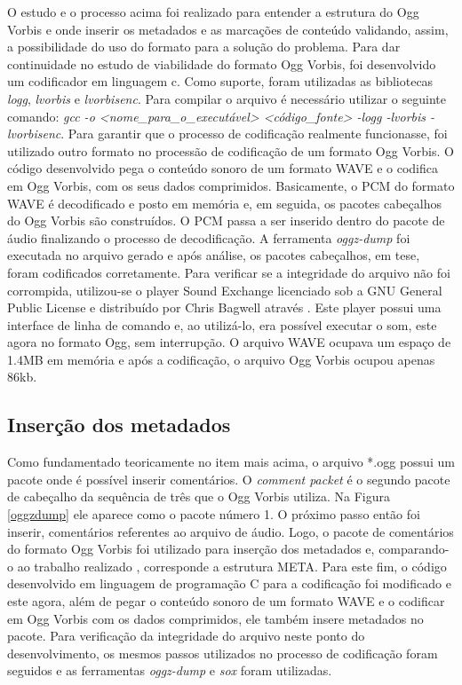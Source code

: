 O estudo e o processo acima foi realizado para entender a estrutura do Ogg Vorbis e onde inserir os metadados e as marcações de conteúdo validando, assim, a possibilidade do uso do formato para a solução do problema. Para dar continuidade no estudo de viabilidade do formato Ogg Vorbis, foi desenvolvido um codificador em linguagem c. Como suporte, foram utilizadas as bibliotecas \textit{logg}, \textit{lvorbis} e \textit{lvorbisenc}. Para compilar o arquivo é necessário utilizar o seguinte comando: \textit{gcc -o <nome\_para\_o\_executável> <código\_fonte> -logg -lvorbis -lvorbisenc}. Para garantir que o processo de codificação realmente funcionasse, foi utilizado outro formato no processão de codificação de um formato Ogg Vorbis. O código desenvolvido pega o conteúdo sonoro de um formato WAVE e o codifica em Ogg Vorbis, com os seus dados comprimidos. Basicamente, o PCM do formato WAVE é decodificado e posto em memória e, em seguida, os pacotes cabeçalhos do Ogg Vorbis são construídos. O PCM passa a ser inserido dentro do pacote de áudio finalizando o processo de decodificação. A ferramenta \textit{oggz-dump} foi executada no arquivo gerado e após análise, os pacotes cabeçalhos, em tese, foram codificados corretamente. Para verificar se a integridade do arquivo não foi corrompida, utilizou-se o player Sound Exchange licenciado sob a GNU General Public License e distribuído por Chris Bagwell através \cite{sox}. Este player possui uma interface de linha de comando e, ao utilizá-lo, era possível executar o som, este agora no formato Ogg, sem interrupção. O arquivo WAVE ocupava um espaço de 1.4MB em memória e após a codificação, o arquivo Ogg Vorbis ocupou apenas 86kb.



\subsection{Inserção dos metadados}

Como fundamentado teoricamente no item mais acima, o arquivo *.ogg possui um pacote onde é possível inserir comentários. O \textit{comment packet} é o segundo pacote de cabeçalho da sequência de três que o Ogg Vorbis utiliza. Na Figura \ref{oggzdump} ele aparece como o pacote número 1. O próximo passo então foi inserir, comentários referentes ao arquivo de áudio. Logo, o pacote de comentários do formato Ogg Vorbis foi utilizado para inserção dos metadados e, comparando-o ao trabalho realizado \cite{herbert}, corresponde a estrutura META. Para este fim, o código desenvolvido em linguagem de programação C para a codificação foi modificado e este agora, além de pegar o conteúdo sonoro de um formato WAVE e o codificar em Ogg Vorbis com os dados comprimidos, ele também insere metadados no pacote. Para verificação da integridade do arquivo neste ponto do desenvolvimento, os mesmos passos utilizados no processo de codificação foram seguidos e as ferramentas \textit{oggz-dump} e \textit{sox} foram utilizadas.


